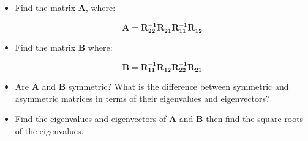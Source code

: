 \documentclass{article}
\begin{document}
\begin{enumerate}
\begin{itemize}

\item Find the matrix $\boldsymbol{A}$, where:

\begin{displaymath}
\boldsymbol{A} = \boldsymbol{R_{22}^{-1}R_{21}R_{11}^{-1}R_{12}}
\end{displaymath}



\item Find the matrix $\boldsymbol{B}$ where:

\begin{displaymath}
\boldsymbol{B} = \boldsymbol{R_{11}^{-1}R_{12}R_{22}^{-1}R_{21}}
\end{displaymath}




\item Are $\boldsymbol{A}$ and $\boldsymbol{B}$ symmetric?   What is the difference between symmetric and asymmetric matrices in terms of their eigenvalues and eigenvectors?\\

\item Find the eigenvalues and eigenvectors of $\boldsymbol{A}$ and $\boldsymbol{B}$ then find the square roots of the eigenvalues.   



\end{itemize}
\end{enumerate}
\end{document}
